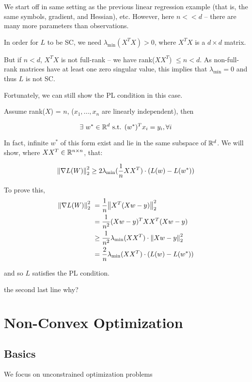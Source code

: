 \begin{eg}
    We start off in same setting as the previous linear regression example (that is, the same symbols, gradient, and Hessian), etc. However, here $n << d$ -- there are many more parameters than observations. 

In order for $L$ to be SC, we need \(\lambda_{\text{min}} (X^TX) > 0\), where \(X^T X\) is a \(d \times d\) matrix. 

But if \(n < d\), $X^TX$ is not full-rank -- we have rank(\(XX^T\)) \(\leq n < d\). As non-full-rank matrices have at least one zero singular value, this implies that \(\lambda_{\text{min}} = 0\) and thus \(L\) is not SC. 

Fortunately, we can still show the PL condition in this case. 

Assume rank(\(X\)) = \(n\), (\(x_1, \ldots, x_n\) are linearly independent), then 

\[
\exists \ w^* \in \mathbb{R}^d \text{ s.t. } (w^*)^T x_i = y_i, \forall i 
\]

In fact, infinite $w^*$ of this form exist and lie in the same subspace of $\mathbb{R}^d$. We will show, where $XX^T \in \mathbb{R}^{n\times n}$, that: 

\[
\norm{\nabla L(W)}_2^2 \geq 2 \lambda_{\text{min}} (\frac{1}{n} X X^T) \cdot (L(w) - L(w^*))
\]

To prove this, 
\begin{align*}
    \norm{\nabla L(W)}_2^2 \ & = \frac{1}{n} \norm{X^T(Xw - y)}_2^2 \\ 
    &= \frac{1}{n^2} (Xw - y)^T XX^T (Xw - y) \\ 
    &\geq \frac{1}{n^2} \lambda_{\text{min}} (XX^T) \cdot \norm{Xw - y}_2^2 \\ 
    &= \frac{2}{n} \lambda_{\text{min}} (XX^T) \cdot (L(w) - L(w^*))
\end{align*}

and so $L$ satisfies the PL condition. 

\color{red} the second last line why? 

\end{eg}


\chapter{Non-Convex Optimization}


\section{Basics}
We focus on unconstrained optimization problems 


